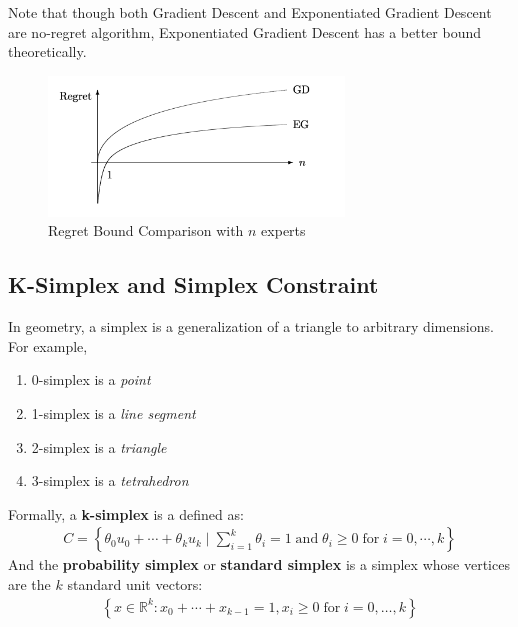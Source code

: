 \documentclass[11pt]{article}
\begin{document}
Note that though both Gradient Descent and Exponentiated Gradient Descent are no-regret algorithm, Exponentiated Gradient Descent has a better bound theoretically.

\begin{figure}[!h]
    \centering
    \includegraphics[width=0.7\textwidth]{regret.png}
    \caption{Regret Bound Comparison with $n$ experts}
    \label{fig:comparison}
\end{figure}


\subsection{K-Simplex and Simplex Constraint\cite{enwiki:1072882470}} 
In geometry, a simplex is a generalization of a triangle to arbitrary dimensions. For example,
\begin{enumerate}
    \item 0-simplex is a \textit{point}
    \item 1-simplex is a \textit{line segment}
    \item 2-simplex is a \textit{triangle}
    \item 3-simplex is a \textit{tetrahedron}
\end{enumerate}
Formally, a \textbf{k-simplex} is a defined as:
\begin{align}
    C = \left\{\theta_0 u_0 + \cdots + \theta_k u_k \; \rvert \; \sum_{i=1}^k \theta_i=1 \;\text{and}\; \theta_i \geq 0 \;\text{for}\; i = 0, \cdots, k  \right\}
\end{align}
And the \textbf{probability simplex} or \textbf{standard simplex} is a simplex whose vertices are the $k$ standard unit vectors:
\begin{align}
    \left\{ x \in \mathbb{R}^k: x_0 + \cdots + x_{k-1}=1,x_i\geq 0 \;\text{for}\; i=0,\ldots ,k \right\}
\end{align}
\end{document}
